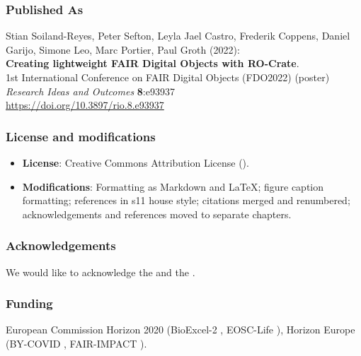 \subsubsection*{Published As}
Stian Soiland-Reyes, Peter Sefton, Leyla Jael Castro, Frederik Coppens,
Daniel Garijo, Simone Leo, Marc Portier, Paul Groth (2022):\\
\textbf{Creating lightweight FAIR Digital Objects with RO-Crate}.\\
1st International Conference on FAIR Digital Objects (FDO2022) (poster)\\
\emph{Research Ideas and Outcomes} \textbf{8}:e93937\\
\url{https://doi.org/10.3897/rio.8.e93937}


\subsubsection*{License and modifications}

\begin{itemize}
\tightlist
\item
  \textbf{License}: Creative Commons Attribution License
  ().
\item
  \textbf{Modifications}: Formatting as Markdown and LaTeX; figure caption
  formatting; references in s11 house style; citations merged and renumbered; 
  acknowledgements and references moved to separate chapters.
\end{itemize}

\subsubsection*{Acknowledgements}

We would like to acknowledge the
 and the
.

\subsubsection*{Funding}

European Commission Horizon 2020 (BioExcel-2
, EOSC-Life
), Horizon
Europe (BY-COVID
,
FAIR-IMPACT
).

